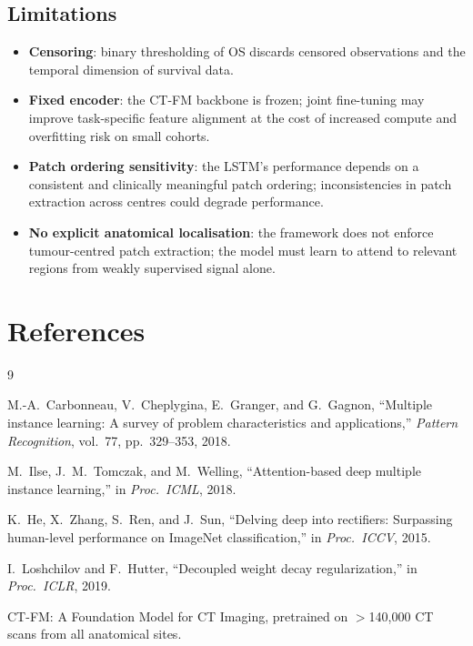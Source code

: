 \documentclass[11pt,a4paper]{article}
\begin{document}
\subsection{Limitations}

\begin{itemize}
  \item \textbf{Censoring}: binary thresholding of OS discards censored observations
        and the temporal dimension of survival data.
  \item \textbf{Fixed encoder}: the CT-FM backbone is frozen; joint fine-tuning
        may improve task-specific feature alignment at the cost of increased
        compute and overfitting risk on small cohorts.
  \item \textbf{Patch ordering sensitivity}: the LSTM's performance depends on a
        consistent and clinically meaningful patch ordering; inconsistencies in
        patch extraction across centres could degrade performance.
  \item \textbf{No explicit anatomical localisation}: the framework does not
        enforce tumour-centred patch extraction; the model must learn to attend to
        relevant regions from weakly supervised signal alone.
\end{itemize}

\section*{References}

\begin{thebibliography}{9}

M.-A.\ Carbonneau, V.\ Cheplygina, E.\ Granger, and G.\ Gagnon,
``Multiple instance learning: A survey of problem characteristics and applications,''
\textit{Pattern Recognition}, vol.\ 77, pp.\ 329--353, 2018.

M.\ Ilse, J.\ M.\ Tomczak, and M.\ Welling,
``Attention-based deep multiple instance learning,''
in \textit{Proc.\ ICML}, 2018.

K.\ He, X.\ Zhang, S.\ Ren, and J.\ Sun,
``Delving deep into rectifiers: Surpassing human-level performance on ImageNet classification,''
in \textit{Proc.\ ICCV}, 2015.

I.\ Loshchilov and F.\ Hutter,
``Decoupled weight decay regularization,''
in \textit{Proc.\ ICLR}, 2019.

CT-FM: A Foundation Model for CT Imaging,
pretrained on $>$140{,}000 CT scans from all anatomical sites.

\end{thebibliography}
\end{document}
